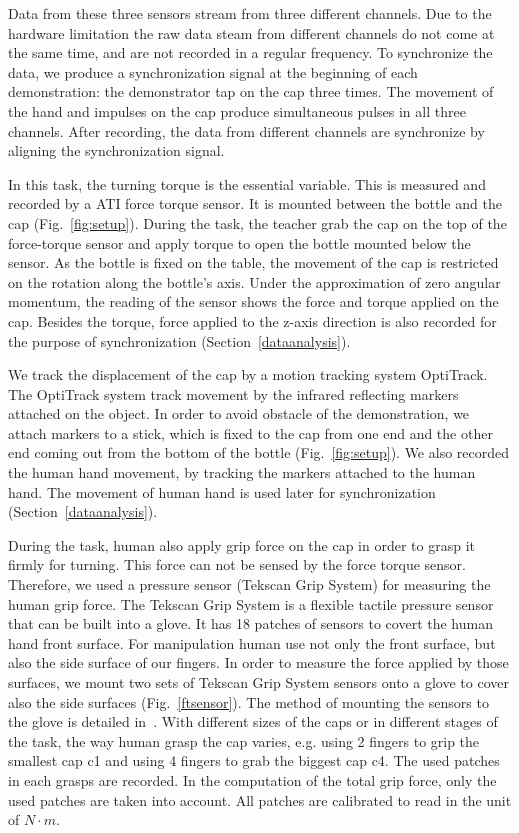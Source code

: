 Data from these three sensors stream from three different channels. Due to the hardware limitation the raw data steam from different channels do not come at the same time, and are not recorded in a regular frequency. To synchronize the data, we produce a synchronization signal at the beginning of each demonstration: the demonstrator tap on the cap three times. The movement of the hand and impulses on the cap produce simultaneous pulses in all three channels. After recording, the data from different channels are synchronize by aligning the synchronization signal.

In this task, the turning torque is the essential variable. This is measured and recorded by a ATI force torque sensor. It is mounted between the bottle and the cap (Fig.~\ref{fig:setup}). During the task, the teacher grab the cap on the top of the force-torque sensor and apply torque to open the bottle mounted below the sensor. As the bottle is fixed on the table, the movement of the cap is restricted on the rotation along the bottle's axis. Under the approximation of zero angular momentum, the reading of the sensor shows the force and torque applied on the cap. Besides the torque, force applied to the z-axis direction is also recorded for the purpose of synchronization (Section~\ref{dataanalysis}).

We track the displacement of the cap by a motion tracking system OptiTrack. The OptiTrack system track movement by the infrared reflecting markers attached on the object. In order to avoid obstacle of the demonstration, we attach markers to a stick, which is fixed to the cap from one end and the other end coming out from the bottom of the bottle (Fig.~\ref{fig:setup}). We also recorded the human hand movement, by tracking the markers attached to the human hand. The movement of human hand is used later for synchronization (Section~\ref{dataanalysis}).

During the task, human also apply grip force on the cap in order to grasp it firmly for turning. This force can not be sensed by the force torque sensor. Therefore, we used a pressure sensor (Tekscan Grip System) for measuring the human grip force. The Tekscan Grip System is a flexible tactile pressure sensor that can be built into a glove. It has 18 patches of sensors to covert the human hand front surface. For manipulation human use not only the front surface, but also the side surface of our fingers. In order to measure the force applied by those surfaces, we mount two sets of Tekscan Grip System sensors onto a glove to cover also the side surfaces (Fig.~\ref{ftsensor}). The method of mounting the sensors to the glove is detailed in~\cite{deSouza2014}. With different sizes of the caps or in different stages of the task, the way human grasp the cap varies, e.g. using 2 fingers to grip the smallest cap c1 and using 4 fingers to grab the biggest cap c4. The used patches in each grasps are recorded. In the computation of the total grip force, only the used patches are taken into account. All patches are calibrated to read in the unit of $N{\cdot}m$.


